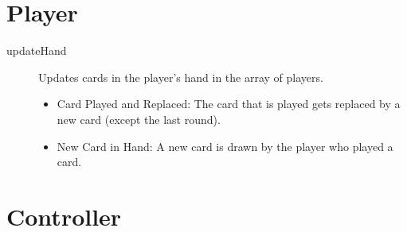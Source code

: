 \documentclass[12pt]{article}
\begin{document}
\section{Player}
\begin{description}
	\item[updateHand] Updates cards in the player's hand in the array of players.
	\begin{itemize}
		\item Card Played and Replaced: The card that is played gets replaced by a new card (except the last round).
		\item New Card in Hand: A new card is drawn by the player who played a card.		
	\end{itemize}
\end{description}

\section{Controller}
\end{document}
